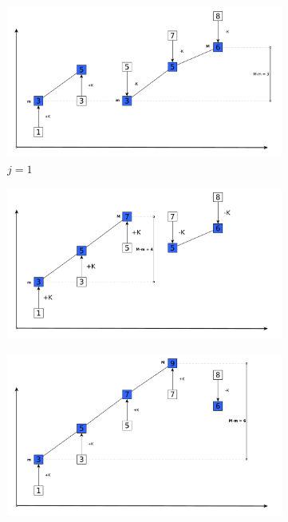 \begin{figure}\ContinuedFloat
	\vspace{-0.5in}
	\begin{subfigure}{0.99\textwidth}
		\centering
		\includegraphics[width=1\linewidth]{sources/smallest_range/images/bars3}
		\caption{$j=1$}
		\label{fig:smallest_range:bars3}
	\end{subfigure}

	
	\medskip
	\begin{subfigure}{0.99\textwidth}
		\centering
		\includegraphics[width=1\linewidth]{sources/smallest_range/images/bars4}
		\label{fig:s3mallest_range:bars4}
	\end{subfigure}

	\begin{subfigure}{0.99\textwidth}
		\centering
		\includegraphics[width=1\linewidth]{sources/smallest_range/images/bars5}
		\label{fig:smallest_range:bars15}
	\end{subfigure}
\end{figure}

